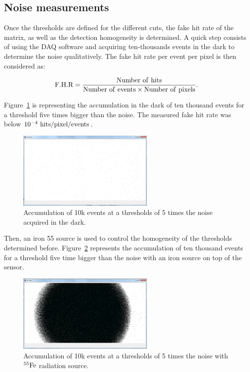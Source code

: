   \subsection{Noise measurements}

  Once the thresholds are defined for the different cuts, the fake hit rate of the matrix, as well as the detection homogeneity is determined.
  A quick step consists of using the DAQ software and acquiring ten-thousands events in the dark to determine the noise qualitatively. 
  The fake hit rate per event per pixel is then considered as:

  \begin{equation}
    \rm{F.H.R} = \frac{\rm{Number~of~hits}}{\rm{Number~of~events} \times \rm{Number~of~pixels}}. 
  \end{equation}
  
  Figure~\ref{fig:darkEvents} is representing the accumulation in the dark of ten thousand events for a threshold five times bigger than the noise.
  The measured fake hit rate was below $10^{-4}~\rm{hits/pixel/events}$.

   \begin{figure}[!h]
    \centering
    \includegraphics[width=0.6\textwidth]{Pictures/labTests/dark_10kEvents_not_noisy.png}
    \caption{Accumulation of 10k events at a thresholds of 5 times the noise acquired in the dark.}
    \label{fig:darkEvents}
  \end{figure}

  Then, an iron 55 source is used to control the homogeneity of the thresholds determined before.
  Figure~\ref{fig:fe55} represents the accumulation of ten thousand events for a threshold five time bigger than the noise with an iron source on top of the sensor.
  
  \begin{figure}[!h]
    \centering
    \includegraphics[width=0.6\textwidth]{Pictures/labTests/10kEvents_Fe55_cut5sigma.png}
    \caption{Accumulation of 10k events at a thresholds of 5 times the noise with $^{55}\rm{Fe}$ radiation source.}
    \label{fig:fe55}
  \end{figure}

